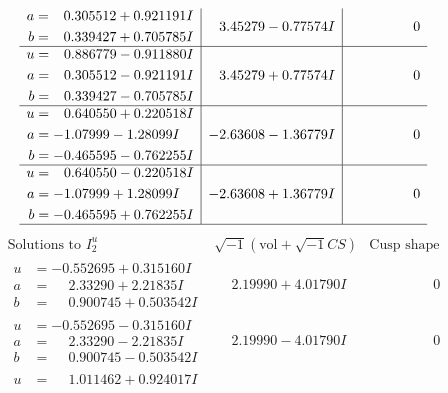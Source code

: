 \documentclass[1p]{elsarticle_modified}
\theoremstyle{definition}
\newcommand{\I}{\sqrt{-1}}
\begin{document}
$$\begin{array}{c|c|c}
\begin{aligned}
a &= \phantom{-}0.305512 + 0.921191 I \\
b &= \phantom{-}0.339427 + 0.705785 I\end{aligned}
 & \phantom{-}3.45279 - 0.77574 I & \phantom{-0.000000 } 0 \\ \hline\begin{aligned}
u &= \phantom{-}0.886779 - 0.911880 I \\
a &= \phantom{-}0.305512 - 0.921191 I \\
b &= \phantom{-}0.339427 - 0.705785 I\end{aligned}
 & \phantom{-}3.45279 + 0.77574 I & \phantom{-0.000000 } 0 \\ \hline\begin{aligned}
u &= \phantom{-}0.640550 + 0.220518 I \\
a &= -1.07999 - 1.28099 I \\
b &= -0.465595 - 0.762255 I\end{aligned}
 & -2.63608 - 1.36779 I & \phantom{-0.000000 } 0 \\ \hline\begin{aligned}
u &= \phantom{-}0.640550 - 0.220518 I \\
a &= -1.07999 + 1.28099 I \\
b &= -0.465595 + 0.762255 I\end{aligned}
 & -2.63608 + 1.36779 I & \phantom{-0.000000 } 0\\
 \hline 
 \end{array}$$\newpage$$\begin{array}{c|c|c}  
\text{Solutions to }I^u_{2}& \I (\text{vol} + \sqrt{-1}CS) & \text{Cusp shape}\\
 \hline 
\begin{aligned}
u &= -0.552695 + 0.315160 I \\
a &= \phantom{-}2.33290 + 2.21835 I \\
b &= \phantom{-}0.900745 + 0.503542 I\end{aligned}
 & \phantom{-}2.19990 + 4.01790 I & \phantom{-0.000000 } 0 \\ \hline\begin{aligned}
u &= -0.552695 - 0.315160 I \\
a &= \phantom{-}2.33290 - 2.21835 I \\
b &= \phantom{-}0.900745 - 0.503542 I\end{aligned}
 & \phantom{-}2.19990 - 4.01790 I & \phantom{-0.000000 } 0 \\ \hline\begin{aligned}
u &= \phantom{-}1.011462 + 0.924017 I \\

\end{aligned}
\end{array}$$
\end{document}

